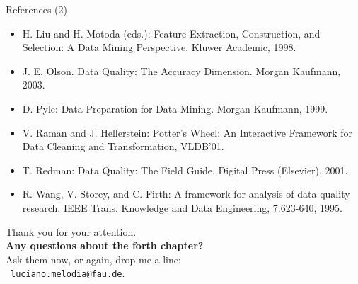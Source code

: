 \documentclass[aspectratio=169,t]{beamer}
\begin{document}
  {
    \begin{frame}{References (2)}
      \begin{itemize}
        \item H. Liu and H. Motoda (eds.): Feature Extraction, Construction, and Selection: A Data Mining Perspective. Kluwer Academic, 1998.
        \item J. E. Olson. Data Quality: The Accuracy Dimension. Morgan Kaufmann, 2003.
        \item D. Pyle: Data Preparation for Data Mining. Morgan Kaufmann, 1999.
        \item {\color{airforceblue}V. Raman and J. Hellerstein: Potter's Wheel: An Interactive Framework for Data Cleaning and Transformation, VLDB'01.}
        \item T. Redman: Data Quality: The Field Guide. Digital Press (Elsevier), 2001.
        \item R. Wang, V. Storey, and C. Firth: A framework for analysis of data quality research. IEEE Trans. Knowledge and Data Engineering, 7:623-640, 1995.
      \end{itemize}
    \end{frame}
  }

  { %
    \begin{frame}[c]
      \begin{center}
        Thank you for your attention.\\
        {\bf Any questions about the forth chapter?}\\[0.5cm]
        Ask them now, or again, drop me a line: \\ 
        \faSendO \ \texttt{luciano.melodia@fau.de}.
      \end{center}
    \end{frame}
  }
\end{document}
